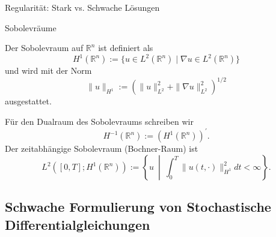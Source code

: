 \documentclass[11pt,aspectratio=169]{beamer}
\begin{document}
\begin{frame}{Regularität: Stark vs. Schwache Lösungen}
\end{frame}


\begin{frame}{Sobolevräume}\small
\begin{minipage}[c]{0.5\linewidth}
 Der Sobolevraum auf $\mathbb{R}^n$ ist definiert als 
\[
    H^1(\mathbb{R}^n) := \{ u \in L^2(\mathbb{R}^n) \mid \nabla u \in L^2(\mathbb{R}^n) \}
\]
und wird mit der Norm 
\[
    \| u \|_{H^1} := \left( \| u \|_{L^2}^2 + \| \nabla u \|_{L^2}^2 \right)^{1/2}
\]
ausgestattet.
\end{minipage}\hfill
\begin{minipage}[c]{0.5\linewidth}
Für den Dualraum des Sobolevraums schreiben wir 
 \[
    H^{-1}(\mathbb{R}^n) := (H^1(\mathbb{R}^n))^\prime.
 \]
Der zeitabhängige Sobolevraum (Bochner-Raum) ist 
\[
    L^2([0,T]; H^1(\mathbb{R}^n)) := \left\{ u \ \middle| \ \int_0^T \| u(t,\cdot) \|_{H^1}^2 dt < \infty \right\}.
\]
\end{minipage}
\end{frame}






\subsection{Schwache Formulierung von Stochastische Differentialgleichungen}
\end{document}

